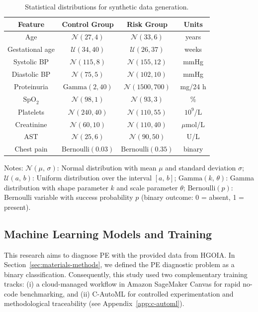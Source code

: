 \documentclass[diagnostics,article,accept,pdftex,moreauthors]{Definitions/mdpi}
\begin{document}
\begin{table}[H]
  \small
  \caption{Statistical distributions for synthetic data generation.\label{tab:distributions}}
\begin{tabularx}{\textwidth}{CCCC}%
\toprule
\textbf{Feature} & \textbf{Control Group} & \textbf{Risk Group} & \textbf{Units} \\
\midrule
Age & $\mathcal{N}(27, 4)$ & $\mathcal{N}(33, 6)$ & years \\
Gestational age & $\mathcal{U}(34, 40)$ & $\mathcal{U}(26, 37)$ & weeks \\
Systolic BP & $\mathcal{N}(115, 8)$ & $\mathcal{N}(155, 12)$ & mmHg \\
Diastolic BP & $\mathcal{N}(75, 5)$ & $\mathcal{N}(102, 10)$ & mmHg \\
Proteinuria & $\text{Gamma}(2, 40)$ & $\mathcal{N}(1500, 700)$ & mg/24 h \\
$\text{SpO}_2$ & $\mathcal{N}(98, 1)$ & $\mathcal{N}(93, 3)$ & \% \\
Platelets & $\mathcal{N}(240, 40)$ & $\mathcal{N}(110, 55)$ & $10^9$/L \\
Creatinine & $\mathcal{N}(60, 10)$ & $\mathcal{N}(110, 40)$ & $\mu$mol/L \\
AST & $\mathcal{N}(25, 6)$ & $\mathcal{N}(90, 50)$ & U/L \\
Chest pain & $\text{Bernoulli}(0.03)$ & $\text{Bernoulli}(0.35)$ & binary \\
\bottomrule
\end{tabularx}
\noindent\footnotesize{Notes:} %
$\mathcal{N}(\mu,\,\sigma)$: Normal distribution with mean $\mu$ and standard
deviation $\sigma$;
$\mathcal{U}(a,\,b)$: Uniform distribution over the interval $[a,\,b]$;
$\mathrm{Gamma}(k,\,\theta)$: Gamma distribution with shape parameter $k$ and
scale parameter $\theta$;
$\mathrm{Bernoulli}(p)$: Bernoulli variable with success probability $p$ (binary
outcome: 0 = absent, 1 = present).
\end{table}

\subsection{Machine Learning Models and Training}
\label{sec:mach-learn-models}
This research aims to diagnose \ac{PE} with the provided data
from \ac{HGOIA}. In Section~\ref{sec:materials-methods}, we
defined the \ac{PE} diagnostic problem as a binary
classification. Consequently, this study used two complementary
training tracks: (i) a cloud-managed workflow in Amazon SageMaker Canvas
for rapid no-code benchmarking, and (ii) \ac{C-AutoML} for controlled
experimentation and methodological traceability (see
Appendix~\ref{app:c-automl}). 
\end{document}
